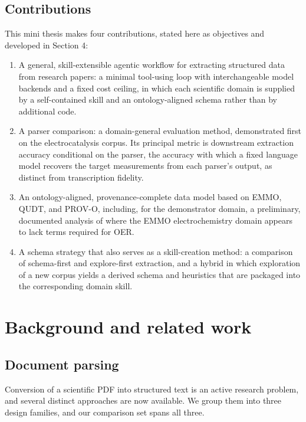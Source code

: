 \documentclass{template}
\begin{document}
\subsection{Contributions}

This mini thesis makes four contributions, stated here as objectives and developed in Section 4:

\begin{enumerate}
\item A general, skill-extensible agentic workflow for extracting structured data from research papers: a minimal tool-using loop with interchangeable model backends and a fixed cost ceiling, in which each scientific domain is supplied by a self-contained skill and an ontology-aligned schema rather than by additional code.
\item A parser comparison: a domain-general evaluation method, demonstrated first on the electrocatalysis corpus. Its principal metric is downstream extraction accuracy conditional on the parser, the accuracy with which a fixed language model recovers the target measurements from each parser's output, as distinct from transcription fidelity.
\item An ontology-aligned, provenance-complete data model based on EMMO, QUDT, and PROV-O, including, for the demonstrator domain, a preliminary, documented analysis of where the EMMO electrochemistry domain appears to lack terms required for OER.
\item A schema strategy that also serves as a skill-creation method: a comparison of schema-first and explore-first extraction, and a hybrid in which exploration of a new corpus yields a derived schema and heuristics that are packaged into the corresponding domain skill.
\end{enumerate}


\section{Background and related work}

\subsection{Document parsing}

Conversion of a scientific PDF into structured text is an active research problem, and several distinct approaches are now available. We group them into three design families, and our comparison set spans all three.
\end{document}
